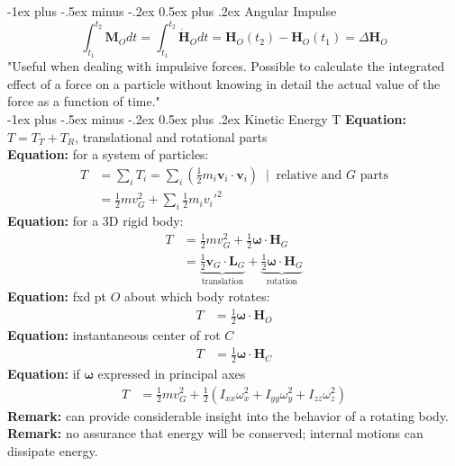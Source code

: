\documentclass[10pt,landscape]{article}
\makeatletter
\renewcommand{\section}{\@startsection{section}{1}{0mm}%
                                {-1ex plus -.5ex minus -.2ex}%
                                {0.5ex plus .2ex}%
                                {\normalfont\large\bfseries}}
\makeatother
\begin{document}
\begin{multicols}{3}
\section{Angular Impulse}
    \[ \int_{t_1}^{t_2}{\mathbf{M}_O}dt = \int_{t_1}^{t_2}{\mathbf{\dot{H}}_O}dt 
        = \mathbf{H}_O(t_2) - \mathbf{H}_O(t_1) = \Delta \mathbf{H}_O \]
    "Useful when dealing with impulsive forces. Possible to calculate the 
    integrated effect of a force on a particle without knowing in detail the 
    actual value of the force as a function of time."\\


\section{Kinetic Energy {T}}
    {\bf Equation:} $T = T_T + T_R$, translational and rotational parts\\
    {\bf Equation:} for a system of particles:
    \begin{align*}
        T &= \sum_i T_i = \sum_i \left( \frac{1}{2} m_i \mathbf{v}_i \cdot \mathbf{v}_i \right) \;\; | \;\;
            \text{relative and $G$ parts} \\
          &= \frac{1}{2} m v_G^2 + \sum_i \frac{1}{2} m_i {v_i'}^2
    \end{align*}
    {\bf Equation:} for a 3D rigid body:
    \begin{align*}
        T &= \frac{1}{2} m v_G^2 + \frac{1}{2} \boldsymbol{\omega}\cdot \mathbf{H}_G \\
          &= \underbrace{\frac{1}{2} \mathbf{v}_G \cdot \mathbf{L}_G}_{\text{translation}} + \underbrace{\frac{1}{2} \boldsymbol{\omega}\cdot \mathbf{H}_G}_{\text{rotation}}
    \end{align*}
    {\bf Equation:} fxd pt $O$ about which body rotates:
    \begin{align*}
        T &= \frac{1}{2} \boldsymbol{\omega}\cdot \mathbf{H}_O 
    \end{align*}
    {\bf Equation:} instantaneous center of rot $C$
    \begin{align*}
        T &= \frac{1}{2} \boldsymbol{\omega}\cdot \mathbf{H}_C 
    \end{align*}
    {\bf Equation:} if $\boldsymbol{\omega}$ expressed in principal axes
    \begin{align*}
        T &= \frac{1}{2} m v_G^2 + 
            \frac{1}{2} \left( I_{xx}\omega_x^2 + I_{yy}\omega_y^2 + I_{zz}\omega_z^2 \right)
    \end{align*}
    {\bf Remark:} can provide considerable insight into the behavior of a 
    rotating body.\\
    {\bf Remark:} no assurance that energy will be conserved; internal motions
    can dissipate energy.



\end{multicols}
\end{document}
